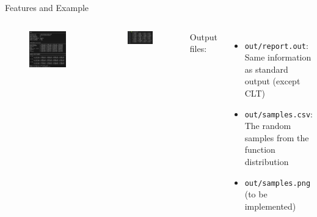 \documentclass[8pt]{beamer}
\begin{document}
\begin{frame}{Features and Example}
\begin{columns}[T]
{            \begin{figure} \centering \includegraphics[width=\textwidth]{img/usage_stdout.png} \end{figure}
        }
         {
            \begin{figure} \centering \includegraphics[width=\textwidth]{img/usage_samples.png} \end{figure}
            \footnotesize Output files:
            \begin{itemize}
                \footnotesize
                \item \texttt{out/report.out}: Same information as standard output (except CLT)
                \item \texttt{out/samples.csv}: The random samples from the function distribution
                \item \texttt{out/samples.png} (to be implemented)
            \end{itemize}
        }
    \end{columns}

\end{frame}
\end{document}
